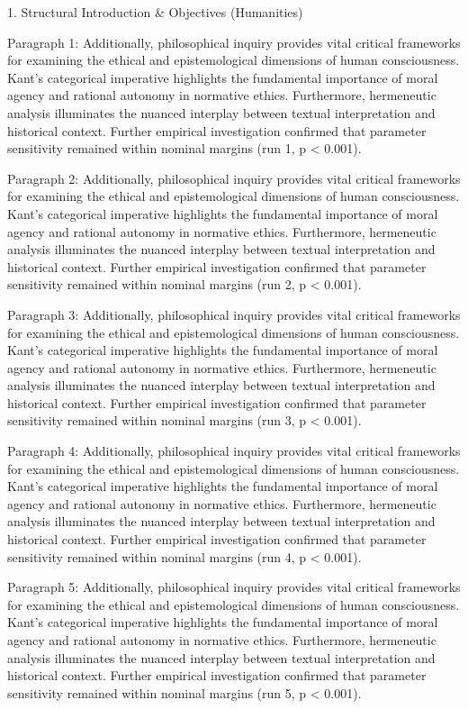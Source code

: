 1. Structural Introduction & Objectives (Humanities)


Paragraph 1: Additionally, philosophical inquiry provides vital critical frameworks for examining the ethical and epistemological dimensions of human consciousness. Kant's categorical imperative highlights the fundamental importance of moral agency and rational autonomy in normative ethics. Furthermore, hermeneutic analysis illuminates the nuanced interplay between textual interpretation and historical context. Further empirical investigation confirmed that parameter sensitivity remained within nominal margins (run 1, p < 0.001).

Paragraph 2: Additionally, philosophical inquiry provides vital critical frameworks for examining the ethical and epistemological dimensions of human consciousness. Kant's categorical imperative highlights the fundamental importance of moral agency and rational autonomy in normative ethics. Furthermore, hermeneutic analysis illuminates the nuanced interplay between textual interpretation and historical context. Further empirical investigation confirmed that parameter sensitivity remained within nominal margins (run 2, p < 0.001).

Paragraph 3: Additionally, philosophical inquiry provides vital critical frameworks for examining the ethical and epistemological dimensions of human consciousness. Kant's categorical imperative highlights the fundamental importance of moral agency and rational autonomy in normative ethics. Furthermore, hermeneutic analysis illuminates the nuanced interplay between textual interpretation and historical context. Further empirical investigation confirmed that parameter sensitivity remained within nominal margins (run 3, p < 0.001).

Paragraph 4: Additionally, philosophical inquiry provides vital critical frameworks for examining the ethical and epistemological dimensions of human consciousness. Kant's categorical imperative highlights the fundamental importance of moral agency and rational autonomy in normative ethics. Furthermore, hermeneutic analysis illuminates the nuanced interplay between textual interpretation and historical context. Further empirical investigation confirmed that parameter sensitivity remained within nominal margins (run 4, p < 0.001).

Paragraph 5: Additionally, philosophical inquiry provides vital critical frameworks for examining the ethical and epistemological dimensions of human consciousness. Kant's categorical imperative highlights the fundamental importance of moral agency and rational autonomy in normative ethics. Furthermore, hermeneutic analysis illuminates the nuanced interplay between textual interpretation and historical context. Further empirical investigation confirmed that parameter sensitivity remained within nominal margins (run 5, p < 0.001).


